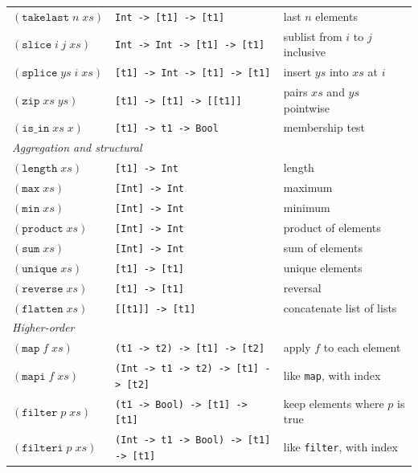 \documentclass[12pt]{article}
\begin{document}
\begin{table}[!htbp]
\begin{tabular}{lll}
$(\texttt{takelast}\;n\;\mathit{xs})$   & \texttt{Int -> [t1] -> [t1]}      & last $n$ elements \\
$(\texttt{slice}\;i\;j\;\mathit{xs})$   & \texttt{Int -> Int -> [t1] -> [t1]} & sublist from $i$ to $j$ inclusive \\
$(\texttt{splice}\;\mathit{ys}\;i\;\mathit{xs})$
                                        & \texttt{[t1] -> Int -> [t1] -> [t1]} & insert $\mathit{ys}$ into $\mathit{xs}$ at $i$ \\
$(\texttt{zip}\;\mathit{xs}\;\mathit{ys})$ & \texttt{[t1] -> [t1] -> [[t1]]} & pairs $\mathit{xs}$ and $\mathit{ys}$ pointwise \\
$(\texttt{is\_in}\;\mathit{xs}\;x)$     & \texttt{[t1] -> t1 -> Bool}       & membership test \\
\midrule
\multicolumn{3}{l}{\textit{Aggregation and structural}} \\
$(\texttt{length}\;\mathit{xs})$        & \texttt{[t1] -> Int}              & length \\
$(\texttt{max}\;\mathit{xs})$           & \texttt{[Int] -> Int}             & maximum \\
$(\texttt{min}\;\mathit{xs})$           & \texttt{[Int] -> Int}             & minimum \\
$(\texttt{product}\;\mathit{xs})$       & \texttt{[Int] -> Int}             & product of elements \\
$(\texttt{sum}\;\mathit{xs})$           & \texttt{[Int] -> Int}             & sum of elements \\
$(\texttt{unique}\;\mathit{xs})$        & \texttt{[t1] -> [t1]}             & unique elements \\
$(\texttt{reverse}\;\mathit{xs})$       & \texttt{[t1] -> [t1]}             & reversal \\
$(\texttt{flatten}\;\mathit{xs})$       & \texttt{[[t1]] -> [t1]}           & concatenate list of lists \\
\midrule
\multicolumn{3}{l}{\textit{Higher-order}} \\
$(\texttt{map}\;f\;\mathit{xs})$        & \texttt{(t1 -> t2) -> [t1] -> [t2]}    & apply $f$ to each element \\
$(\texttt{mapi}\;f\;\mathit{xs})$       & \texttt{(Int -> t1 -> t2) -> [t1] -> [t2]} & like \texttt{map}, with index \\
$(\texttt{filter}\;p\;\mathit{xs})$     & \texttt{(t1 -> Bool) -> [t1] -> [t1]}      & keep elements where $p$ is true \\
$(\texttt{filteri}\;p\;\mathit{xs})$    & \texttt{(Int -> t1 -> Bool) -> [t1] -> [t1]} & like \texttt{filter}, with index \\

\end{tabular}
\end{table}
\end{document}
